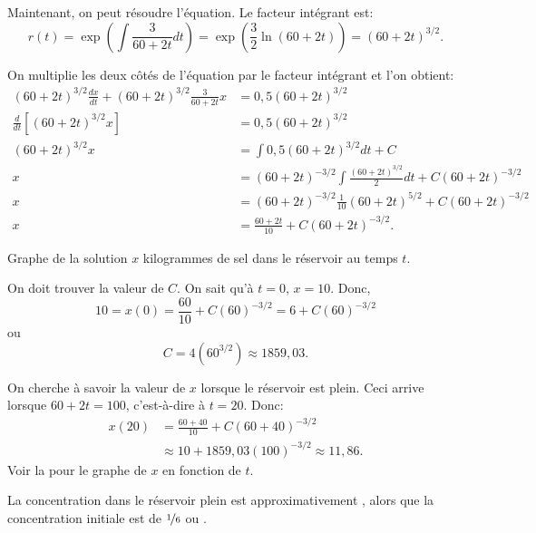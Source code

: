 \begin{example}
	Maintenant, on peut résoudre l'équation.  Le facteur intégrant est:
	\begin{equation*}
		r(t) = \exp \left( \int \frac{3}{60+2t} dt  \right)
		= 	\exp \left( \frac{3}{2} \ln (60+2t) \right)
		= 	{(60+2t)}^{3/2} .
	\end{equation*}

	On multiplie les deux côtés de l'équation par le facteur intégrant et l'on obtient:
	\begin{align*}
	{(60+2t)}^{3/2} \frac{dx}{dt} + {(60+2t)}^{3/2} \frac{3}{60+2t} x
		& = 	0,5{(60+2t)}^{3/2} \\
	\frac{d}{dt}\left[{(60+2t)}^{3/2} x \right]
		& = 0,5{(60+2t)}^{3/2} \\
	{(60+2t)}^{3/2} x
		& = \int  0,5{(60+2t)}^{3/2} dt +C \\
	 x	& = 	{(60+2t)}^{-3/2} \int  \frac{{(60+2t)}^{3/2}}{2}dt
					+C{(60+2t)}^{-3/2} \\
	 x	& =	{(60+2t)}^{-3/2}\frac{1}{10}{(60+2t)}^{5/2}	+C{(60+2t)}^{-3/2} \\
	 x	& = \frac{60+2t}{10}+C{(60+2t)}^{-3/2} .
	\end{align*}

	\begin{mywrapfig}{3.25in}
		\capstart{}
		\caption{Graphe de la solution $x$ kilogrammes de sel dans le réservoir au temps $t$.\label{linear-salt-graph:fig}}
	\end{mywrapfig}
	On doit trouver la valeur de $C$.  On sait qu'à $t=0$, $x=10$.
	Donc,
	\begin{equation*}
		10 = x(0) 	= 	\frac{60}{10}+C{(60)}^{-3/2} =6 +C{(60)}^{-3/2}
	\end{equation*}
	ou
	\begin{equation*}
		C=4 ({60}^{3/2}) \approx 1859{,}03 .
	\end{equation*}

	On cherche à savoir la valeur de $x$ lorsque le réservoir est plein.  Ceci arrive lorsque $60+2t = 100$, c'est-à-dire à  $t=20$.  Donc:
	\begin{equation*}
	\begin{split}
		x(20) & = 	\frac{60+40}{10}+C{(60+40)}^{-3/2}	\\
	 		& \approx	10 +1859,03 {(100)}^{-3/2} \approx 11,86 .
	\end{split}
	\end{equation*}
	Voir la  pour le graphe de $x$ en fonction de $t$.

	La concentration dans le réservoir plein est approximativement ,
	alors que la concentration initiale est de $\nicefrac{1}{6}$ ou .
\end{example}

